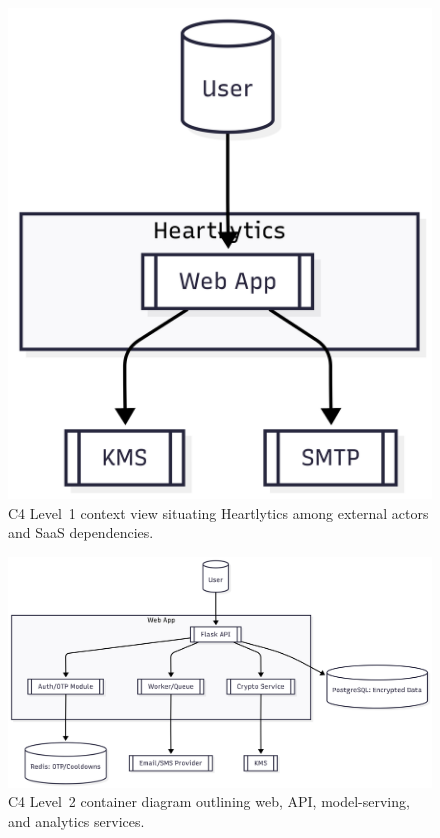 \documentclass[12pt]{article}
\begin{document}
\begin{figure}[t]
  \centering
  \includegraphics[width=0.9\linewidth]{c4_level_1_context.png}
  \caption{C4 Level~1 context view situating Heartlytics among external actors and SaaS dependencies.}
  \label{fig:c4_context}
\end{figure}

\begin{figure}[t]
  \centering
  \includegraphics[width=0.9\linewidth]{c4_level_2_containers.png}
  \caption{C4 Level~2 container diagram outlining web, API, model-serving, and analytics services.}
  \label{fig:c4_containers}
\end{figure}
\end{document}
